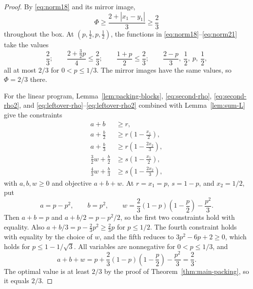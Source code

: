 \documentclass[10pt]{amsart}
\theoremstyle{remark}
\begin{document}
\begin{proof}
By \eqref{eq:norm18} and its mirror image,
\[
 \Phi\geq\frac{2+|x_1-y_1|}{3}\geq\frac23
\]
throughout the box. At $(p,\tfrac12,p,\tfrac12)$, the functions in
\eqref{eq:norm18}--\eqref{eq:norm21} take the values
\[
 \frac23;\qquad
 \frac{2+\tfrac32p}{4}\leq\frac23;\qquad
 \frac{1+p}{2}\leq\frac23;\qquad
 \frac{2-p}{3},\ \frac12,\ p,\ \frac12,
\]
all at most $2/3$ for $0<p\leq1/3$. The mirror images have the same values,
so $\Phi=2/3$ there.

For the linear program, Lemma~\ref{lem:packing-blocks},
\eqref{eq:second-rho}, \eqref{eq:second-rho2}, and
\eqref{eq:leftover-rho}--\eqref{eq:leftover-rho2} combined with
Lemma~\ref{lem:sum-L} give the constraints
\begin{align*}
 a+b&\geq r,\\
 a+\frac b2&\geq r\left(1-\frac{x_1}{2}\right),\\
 a+\frac b3&\geq r\left(1-\frac{2x_2}{3}\right),\\
 \frac32w+\frac b2&\geq s\left(1-\frac{x_1}{2}\right),\\
 \frac43w+\frac b3&\geq s\left(1-\frac{2x_2}{3}\right),
\end{align*}
with $a,b,w\geq0$ and objective $a+b+w$. At
$r=x_1=p$, $s=1-p$, and $x_2=1/2$, put
\[
 a=p-p^2,
 \qquad b=p^2,
 \qquad
 w=\frac23(1-p)\left(1-\frac p2\right)-\frac{p^2}{3}.
\]
Then $a+b=p$ and $a+b/2=p-p^2/2$, so the first two constraints hold with
equality. Also
$a+b/3=p-\tfrac23p^2\geq\tfrac23p$ for $p\leq1/2$. The fourth constraint
holds with equality by the choice of $w$, and the fifth reduces to
$3p^2-6p+2\geq0$, which holds for
$p\leq1-1/\sqrt3$. All variables are nonnegative for $0<p\leq1/3$, and
\[
 a+b+w
 =p+\frac23(1-p)\left(1-\frac p2\right)-\frac{p^2}{3}
 =\frac23.
\]
The optimal value is at least $2/3$ by the proof of
Theorem~\ref{thm:main-packing}, so it equals $2/3$.
\end{proof}
\end{document}
